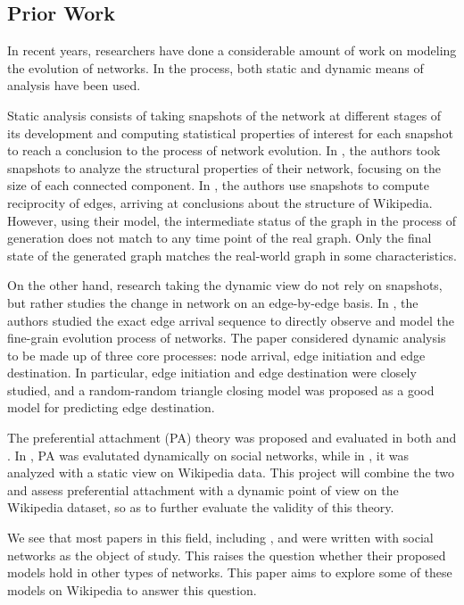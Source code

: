 \documentclass[10pt]{article}
\begin{document}
\begin{multicols}{2}
\section{Prior Work}

In recent years, researchers have done a considerable amount of work on modeling the evolution of networks. In the process, both static and dynamic means of analysis have been used.

Static analysis consists of taking snapshots of the network at different stages of its development and computing statistical properties of interest for each snapshot to reach a conclusion to the process of network evolution. In \cite{kumar2010structure}, the authors took snapshots to analyze the structural properties of their network, focusing on the size of each connected component. In \cite{zlatic2011model}, the authors use snapshots to compute reciprocity of edges, arriving at conclusions about the structure of Wikipedia. However, using their model, the intermediate status of the graph in the process of generation does not match to any time point of the real graph. Only the final state of the generated graph matches the real-world graph in some characteristics.

On the other hand, research taking the dynamic view do not rely on snapshots, but rather studies the change in network on an edge-by-edge basis. In \cite{leskovec2008microscopic}, the authors studied the exact edge arrival sequence to directly observe and model the fine-grain evolution process of networks. The paper considered dynamic analysis to be made up of three core processes: node arrival, edge initiation and edge destination. In particular, edge initiation and edge destination were closely studied, and a random-random triangle closing model was proposed as a good model for predicting edge destination.

The preferential attachment (PA) theory was proposed and evaluated in both \cite{leskovec2008microscopic} and \cite{zlatic2011model}. In \cite{leskovec2008microscopic}, PA was evalutated dynamically on social networks, while in \cite{zlatic2011model}, it was analyzed with a static view on Wikipedia data. This project will combine the two and assess preferential attachment with a dynamic point of view on the Wikipedia dataset, so as to further evaluate the validity of this theory.

We see that most papers in this field, including \cite{leskovec2008microscopic}, \cite{kossinets2006empirical} and \cite{kumar2010structure} were written with social networks as the object of study. This raises the question whether their proposed models hold in other types of networks. This paper aims to explore some of these models on Wikipedia to answer this question.


\end{multicols}
\end{document}
